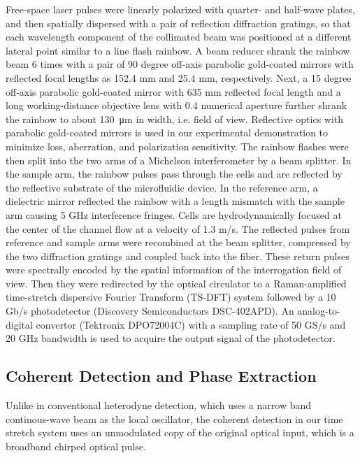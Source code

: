 \documentclass[aps,pra,reprint,superscriptaddress]{revtex4-1}
\begin{document}
Free-space laser pulses were linearly polarized with quarter- and half-wave plates, and then spatially dispersed with a pair of reflection diffraction gratings, so that each wavelength component of the collimated beam was positioned at a different lateral point similar to a line flash rainbow. A beam reducer shrank the rainbow beam 6 times with a pair of 90 degree off-axis parabolic gold-coated mirrors with reflected focal lengths as 152.4 mm and 25.4 mm, respectively. Next, a 15 degree off-axis parabolic gold-coated mirror with 635 mm reflected focal length and a long working-distance objective lens with 0.4 numerical aperture further shrank the rainbow to about \SI{130}{\micro\meter} in width, i.e. field of view. Reflective optics with parabolic gold-coated mirrors is used in our experimental demonstration to minimize loss, aberration, and polarization sensitivity. The rainbow flashes were then split into the two arms of a Michelson interferometer by a beam splitter. In the sample arm, the rainbow pulses pass through the cells and are reflected by the reflective substrate of the microfluidic device. In the reference arm, a dielectric mirror reflected the rainbow with a length mismatch with the sample arm causing 5 GHz interference fringes. Cells are hydrodynamically focused at the center of the channel flow at a velocity of 1.3 m/s. The reflected pulses from reference and sample arms were recombined at the beam splitter, compressed by the two diffraction gratings and coupled back into the fiber. These return pulses were spectrally encoded by the spatial information of the interrogation field of view. Then they were redirected by the optical circulator to a Raman-amplified time-stretch dispersive Fourier Transform (TS-DFT) system followed by a 10 Gb/s photodetector (Discovery Semiconductors DSC-402APD). An analog-to-digital convertor (Tektronix DPO72004C) with a sampling rate of 50 GS/s and 20 GHz bandwidth is used to acquire the output signal of the photodetector.

\subsection{Coherent Detection and Phase Extraction}

Unlike in conventional heterodyne detection, which uses a narrow band continous-wave beam as the local oscillator, the coherent detection in our time stretch system uses an unmodulated copy of the original optical input, which is a broadband chirped optical pulse. 
\end{document}
